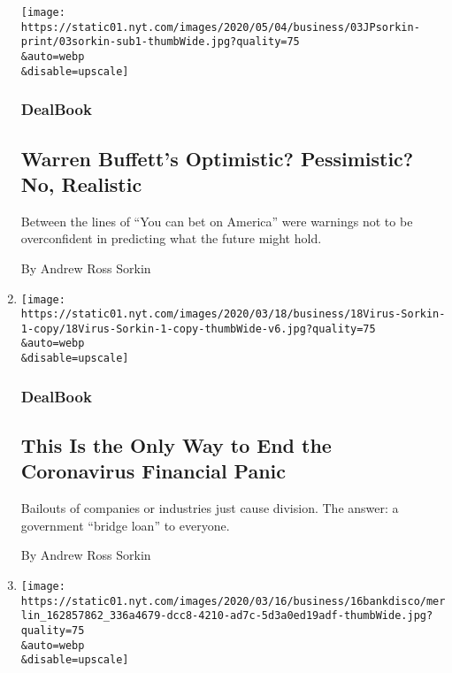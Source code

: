 \begin{enumerate}
  \texttt{[image: https://static01.nyt.com/images/2020/05/04/business/03JPsorkin-print/03sorkin-sub1-thumbWide.jpg?quality=75\\\&auto=webp\\\&disable=upscale]}

  \hypertarget{dealbook-1}{%
  \subsubsection{DealBook}\label{dealbook-1}}

  \hypertarget{warren-buffetts-optimistic-pessimistic-no-realistic}{%
  \subsection{Warren Buffett's Optimistic? Pessimistic? No,
  Realistic}\label{warren-buffetts-optimistic-pessimistic-no-realistic}}

  Between the lines of ``You can bet on America'' were warnings not to
  be overconfident in predicting what the future might hold.

  By Andrew Ross Sorkin
\item
  \href{/2020/03/18/business/dealbook/coronavirus-economy-bailout-plan.html}{}

  \texttt{[image: https://static01.nyt.com/images/2020/03/18/business/18Virus-Sorkin-1-copy/18Virus-Sorkin-1-copy-thumbWide-v6.jpg?quality=75\\\&auto=webp\\\&disable=upscale]}

  \hypertarget{dealbook-2}{%
  \subsubsection{DealBook}\label{dealbook-2}}

  \hypertarget{this-is-the-only-way-to-end-the-coronavirus-financial-panic}{%
  \subsection{This Is the Only Way to End the Coronavirus Financial
  Panic}\label{this-is-the-only-way-to-end-the-coronavirus-financial-panic}}

  Bailouts of companies or industries just cause division. The answer: a
  government ``bridge loan'' to everyone.

  By Andrew Ross Sorkin
\item
  \href{/2020/03/16/business/fed-discount-window.html}{}

  \texttt{[image: https://static01.nyt.com/images/2020/03/16/business/16bankdisco/merlin\_162857862\_336a4679-dcc8-4210-ad7c-5d3a0ed19adf-thumbWide.jpg?quality=75\\\&auto=webp\\\&disable=upscale]}


\end{enumerate}
